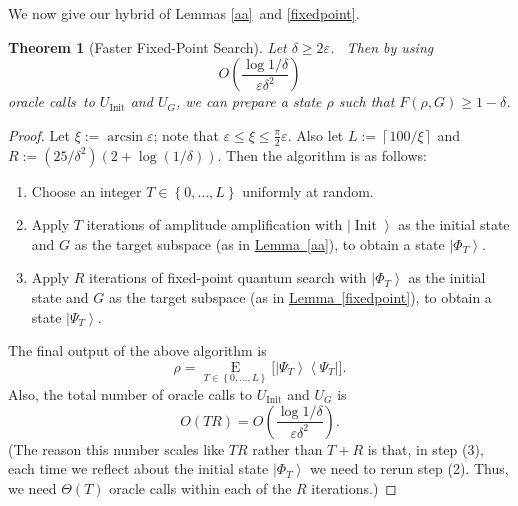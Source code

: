 \documentclass[10pt]{article}
\newtheorem{theorem}{Theorem}[section]
\theoremstyle{definition}
\numberwithin{equation}{section}
\newcommand{\expref}[2]{\texorpdfstring{\hyperref[#2]{#1~\ref{#2}}}{#1~\ref{#2}}}
\begin{document}
We now give our hybrid of Lemmas \ref{aa}\ and \ref{fixedpoint}.

\begin{theorem}
[Faster Fixed-Point Search]\label{combined}Let $\delta\geq2\varepsilon$.
\ Then by using \[
O\left(  \frac{\log1/\delta}{\varepsilon\delta^{2}}\right)
\]
oracle calls\ to $U_{\operatorname*{Init}}$ and $U_{G}$, we can prepare a
state $\rho$ such that $F\left(  \rho,G\right)  \geq1-\delta$.
\end{theorem}

\begin{proof}
Let $\xi:=\arcsin\varepsilon$; note that $\varepsilon\leq\xi\leq\frac{\pi}%
{2}\varepsilon$. Also let $L:=\left\lceil 100/\xi\right\rceil $ and
$R:=({25}/{\delta^{2}})\left(  2+\log({1}/{\delta})\right)  $. Then the
algorithm is as follows:

\begin{enumerate}
\item[(1)] Choose an integer $T\in\left\{  0,\ldots,L\right\}  $ uniformly at random.

\item[(2)] Apply $T$ iterations of amplitude amplification with $\left\vert
\operatorname*{Init}\right\rangle $ as the initial state and $G$ as the
target subspace (as in \expref{Lemma}{aa}), to obtain a state $\left\vert \Phi
_{T}\right\rangle $.

\item[(3)] Apply $R$ iterations of fixed-point quantum search with
$\left\vert \Phi_{T}\right\rangle $ as the initial state and $G$ as the
target subspace (as in \expref{Lemma}{fixedpoint}), to obtain a state $\left\vert
\Psi_{T}\right\rangle $.
\end{enumerate}

The final output of the above algorithm is
\[
\rho=\operatorname*{E}_{T\in\left\{  0,\ldots,L\right\}  }\bigl[  \left\vert
\Psi_{T}\right\rangle \left\langle \Psi_{T}\right\vert \bigr]  .
\]
Also, the total number of oracle calls to $U_{\operatorname*{Init}}$ and
$U_{G}$ is%
\[
O\left(  TR\right)  =O\left(  \frac{\log1/\delta}{\varepsilon\delta^{2}%
}\right)  .
\]
(The reason this number scales like $TR$ rather than $T+R$ is that, in step
(3), each time we reflect about the initial state $\left\vert \Phi
_{T}\right\rangle $ we need to rerun step (2). Thus, we need $\Theta\left(
T\right)  $ oracle calls within each of the $R$ iterations.)


\end{proof}
\end{document}
